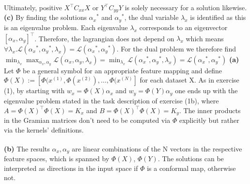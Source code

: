 \documentclass[a4paper]{article}
\newcommand{\Yt}{{Y^\top}}
\newcommand{\Xt}{{X^\top}}
\newcommand{\lx}{{\lambda_{x}}}
\newcommand{\ax}{{\alpha_{x}}}
\newcommand{\ay}{{\alpha_{y}}}
\newcommand{\Cxx}{C_{xx}}
\newcommand{\Cyy}{C_{yy}}
\newcommand{\1}{\mathds{1}}
\newcommand{\lag}{\mathcal{L}}
\begin{document}
Ultimately, positive 
$\Xt\Cxx X$ or $\Yt\Cyy Y$ is solely necessary for a solution likewise.\\
\textbf{(c)} By finding the solutions $\ax^*$ and $\ay^*$, the dual variable $\lx$
is identified as this is an eigenvalue problem. 
Each eigenvalue $\lx$ corresponds to an eigenvector $[\ax,\ay]^\top$. 
Therefore, the lagrangian does not depend on $\lx$ which means 
$\forall\lx . \lag(\ax^*,\ay^*,\lx) = \lag(\ax^*,\ay^*)$. 
For the dual problem we therefore find
$ 
\min_\lx \max_{\ax,\ay} \lag(\ax,\ay,\lx) 
= \min_\lx \lag(\ax^*,\ay^*,\lx) 
= \lag(\ax^*,\ay^*)
$
\newpage
{}
\textbf{(a)} Let $\Phi$ be a general symbol for an appropriate feature mapping and 
define $\Phi(X) := [\Phi(x^{(1)}, \Phi(x^{(2)}), \ldots, \Phi(x^{(N)}]$ for each 
dataset X. As in exercise (1), by starting with $w_x = \Phi(X)\ax$ and 
$w_y = \Phi(Y)\ay$ one ends up with the eigenvalue problem stated in the task 
description of exercise (1b), where $A = \Phi(X)^\top \Phi(X) = K_x$ and
$B = \Phi(X)^\top \Phi(X) = K_y$. The inner products in the Gramian matrices 
don't need to be computed via $\Phi$ explicitly but rather via the kernels' 
definitions. \\
\\
\textbf{(b)} 
The results $\ax, \ay$ are linear combinations of the N vectors in the respective 
feature spaces, which is spanned by $\Phi(X)$, $\Phi(Y)$. The solutions can be interpreted as directions in the input space 
if $\Phi$ is a conformal map, otherwise not.    
\end{document}
